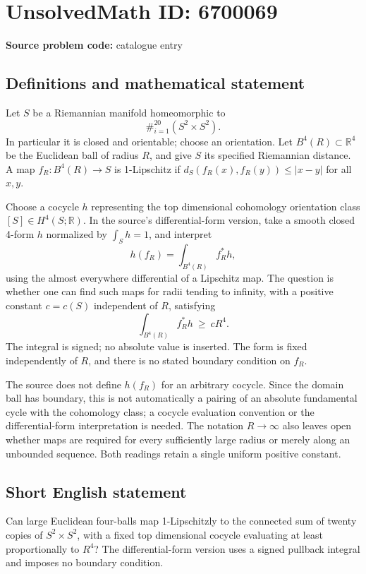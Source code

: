 \documentclass[11pt]{article}
\newcommand{\R}{\mathbb{R}}
\begin{document}
\section*{UnsolvedMath ID: 6700069}
\textbf{Source problem code:} catalogue entry
\subsection{Definitions and mathematical statement}
Let \(S\) be a Riemannian manifold homeomorphic to
\[
 \#_{i=1}^{20}(S^2\times S^2).
\]
In particular it is closed and orientable; choose an orientation. Let \(B^4(R)\subset\R^4\) be the Euclidean ball of radius \(R\), and give \(S\) its specified Riemannian distance. A map \(f_R:B^4(R)\to S\) is 1-Lipschitz if \(d_S(f_R(x),f_R(y))\leq|x-y|\) for all \(x,y\).

Choose a cocycle \(h\) representing the top dimensional cohomology orientation class \([S]\in H^4(S;\R)\). In the source's differential-form version, take a smooth closed 4-form \(h\) normalized by \(\int_S h=1\), and interpret
\[
 h(f_R)=\int_{B^4(R)}f_R^*h,
\]
using the almost everywhere differential of a Lipschitz map. The question is whether one can find such maps for radii tending to infinity, with a positive constant \(c=c(S)\) independent of \(R\), satisfying
\[
 \int_{B^4(R)}f_R^*h\ \geq\ cR^4.
\]
The integral is signed; no absolute value is inserted. The form is fixed independently of \(R\), and there is no stated boundary condition on \(f_R\).

The source does not define \(h(f_R)\) for an arbitrary cocycle. Since the domain ball has boundary, this is not automatically a pairing of an absolute fundamental cycle with the cohomology class; a cocycle evaluation convention or the differential-form interpretation is needed. The notation \(R\to\infty\) also leaves open whether maps are required for every sufficiently large radius or merely along an unbounded sequence. Both readings retain a single uniform positive constant.
\subsection{Short English statement}
Can large Euclidean four-balls map 1-Lipschitzly to the connected sum of twenty copies of \(S^2\times S^2\), with a fixed top dimensional cocycle evaluating at least proportionally to \(R^4\)? The differential-form version uses a signed pullback integral and imposes no boundary condition.
\end{document}
